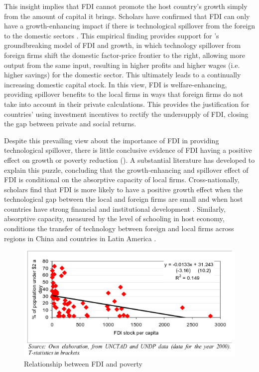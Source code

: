 This insight implies that FDI cannot promote the host country's growth simply from the amount of capital it brings. Scholars have confirmed that FDI can only have a growth-enhancing impact if there is technological spillover from the foreign to the domestic sectors \citep{Nunnenkamp2004}. This empirical finding provides support for \citet{Findlay1978}'s groundbreaking model of FDI and growth, in which technology spillover from foreign firms shift the domestic factor-price frontier to the right, allowing more output from the same input, resulting in higher profits and higher wages (i.e. higher savings) for the domestic sector. This ultimately leads to a continually increasing domestic capital stock. In this view, FDI is welfare-enhancing, providing spillover benefits to the local firms in ways that foreign firms do not take into account in their private calculations. This provides the justification for countries' using investment incentives to rectify the undersupply of FDI, closing the gap between private and social returns. 

Despite this prevailing view about the importance of FDI in providing technological spillover, there is little conclusive evidence of FDI having a positive effect on growth \citep{Nair-Reichert2001, Carkovic2002} or poverty reduction \citep{Guerra2009} (). A substantial literature has developed to explain this puzzle, concluding that the growth-enhancing and spillover effect of FDI is conditional on the absorptive capacity of local firms. Cross-nationally, scholars find that FDI is more likely to have a positive growth effect when the technological gap between the local and foreign firms are small \citep{Nunnenkamp2004} and when host countries have strong financial and institutional development \citep{ Durham2004}. Similarly, absorptive capacity, measured by the level of schooling in host economy, conditions the transfer of technology between foreign and local firms across regions in China \citep{Fu2008} and countries in Latin America \citep{Willem2004}.

\begin{figure}[!ht]
\includegraphics[width=\textwidth, height=\textheight,keepaspectratio]{../figure/fdi_poverty}
\caption{Relationship between FDI and poverty}
\label{fig:fdipoverty}
\end{figure}


